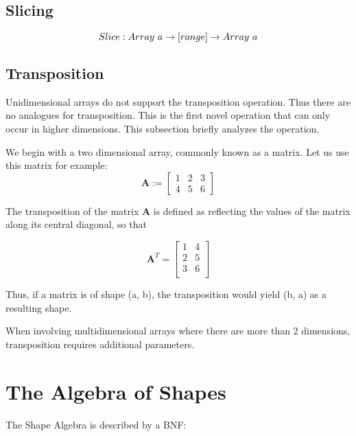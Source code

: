 \documentclass{article}
\begin{document}
\subsection{Slicing}

$$
Slice : Array\ a \rightarrow [range] \rightarrow Array\ a\\
$$



\subsection{Transposition}

Unidimensional arrays do not support the transposition operation. Thus there are no analogues for transposition. This is the first novel operation that can only occur in higher dimensions. This subsection briefly analyzes the operation.

We begin with a two dimensional array, commonly known as a matrix. Let us use this matrix for example:
\begin{equation*}
  \mathbf{A} :=
\begin{bmatrix}
  1 & 2 & 3\\
  4 & 5 & 6
\end{bmatrix}
\end{equation*}

The transposition of the matrix $\mathbf{A}$ is defined as reflecting the values of the matrix along its central diagonal, so that

\begin{equation*}
  \mathbf{A}^T =
  \begin{bmatrix}
    1 & 4\\
    2 & 5\\
    3 & 6\\
  \end{bmatrix}
\end{equation*}

Thus, if a matrix is of shape (a, b), the transposition would yield (b, a) as a resulting shape.

When involving multidimensional arrays where there are more than 2 dimensions, transposition requires additional parameters.

\section {The Algebra of Shapes}

The Shape Algebra is described by a BNF:
\end{document}
